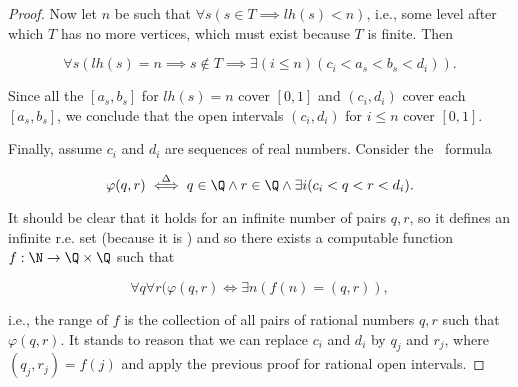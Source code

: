 \documentclass[../main.tex]{memoir}
\begin{document}
\begin{proof}
  Now let $n$ be such that $\forall s (s \in T \implies lh(s) < n)$, i.e., some level after which $T$ has no more vertices, which must exist because $T$ is finite. Then

  \[ \forall s (lh(s) = n \implies s \not\in T \implies \exists (i \le n) (c_i < a_s < b_s < d_i)). \]

  Since all the $[a_s, b_s]$ for $lh(s) = n$ cover $[0, 1]$ and $(c_i, d_i)$ cover each $[a_s, b_s]$, we conclude that the open intervals $(c_i, d_i)$ for $i \le n$ cover $[0, 1]$.

  Finally, assume $c_i$ and $d_i$ are sequences of real numbers. Consider the \re\ formula

  \[ \varphi(q, r) \overset{\Delta}{\iff} q \in \Q \land r \in \Q \land \exists i (c_i < q < r < d_i). \]

  It should be clear that it holds for an infinite number of pairs $q, r$, so it defines an infinite r.e. set (because it is \re) and so there exists a computable function $f: \N \to \Q \times \Q$ such that

  \[ \forall q \forall r (\varphi(q, r) \iff \exists n (f(n) = (q, r)), \]

  i.e., the range of $f$ is the collection of all pairs of rational numbers $q, r$ such that $\varphi(q, r)$. It stands to reason that we can replace $c_i$ and $d_i$ by $q_j$ and $r_j$, where $(q_j, r_j) = f(j)$ and apply the previous proof for rational open intervals.
\end{proof}
\end{document}
